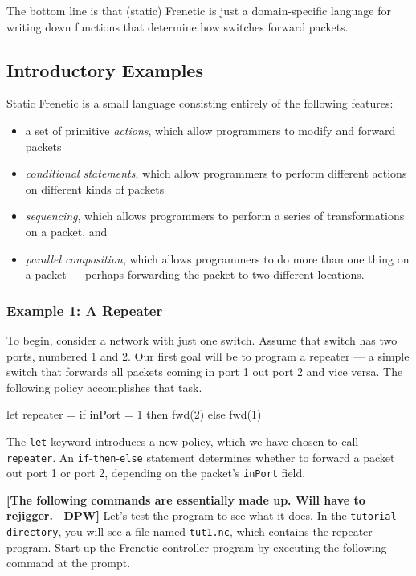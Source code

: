 \documentclass{article}
\newcommand{\finish}[2][cornellred]{\ifdraft\textcolor{#1}{\textbf{[#2]}}\fi}
\newcommand{\dpw}[1]{\finish[cornellred]{#1 --DPW}}
\newcommand{\code}[1]{\texttt{#1}}
\newcommand{\tutorialdir}{\texttt{tutorial directory}}
\begin{document}
The bottom line is that (static) Frenetic is just a domain-specific
language for writing down functions that determine how switches
forward packets.

\subsection{Introductory Examples}

Static Frenetic is a small language consisting entirely of the following
features:

\begin{itemize}
\item a set of primitive \emph{actions}, which allow programmers to modify and 
forward packets
\item \emph{conditional statements}, which allow programmers to perform 
different actions on different kinds of packets
\item  \emph{sequencing}, which allows programmers to perform a series of
transformations on a packet, and
\item \emph{parallel composition}, which allows programmers to do more
than one thing on a packet --- perhaps forwarding the packet to two 
different locations.
\end{itemize}

\subsubsection{Example 1: A Repeater}

To begin, consider a network with just one switch.  Assume that switch 
has two ports, numbered 1 and 2.  Our first goal will be to program
a repeater --- a simple switch that forwards all packets coming in port 1
out port 2 and vice versa.  The following policy accomplishes that task.

\begin{progeg}
let repeater =
  if inPort = 1 then fwd(2)
  else fwd(1)
\end{progeg}

The \code{let} keyword introduces a new policy, which we have chosen to call 
\code{repeater}.  An \code{if}-\code{then}-\code{else} statement determines
whether to forward a packet out port 1 or port 2, depending on the packet's
\code{inPort} field.

\dpw{The following commands are essentially made up.  Will have to rejigger.}
Let's test the program to see what it does.  In the \tutorialdir{},
you will see a file named \code{tut1.nc}, which contains the
repeater program.  Start up the Frenetic controller program by 
executing the following command at the prompt.
\end{document}
